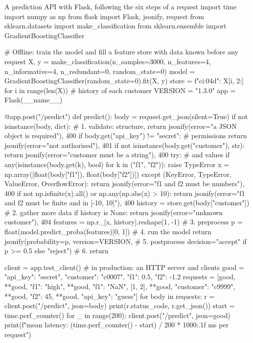 \begin{pylisting}[label={lst:api}]{A prediction API with Flask, following the six steps of a request}
import time
import numpy as np
from flask import Flask, jsonify, request
from sklearn.datasets import make_classification
from sklearn.ensemble import GradientBoostingClassifier

# Offline: train the model and fill a feature store with data known before any request
X, y = make_classification(n_samples=3000, n_features=4, n_informative=4, n_redundant=0,
                           random_state=0)
model = GradientBoostingClassifier(random_state=0).fit(X, y)
store = {f"c{i:04d}": X[i, 2:] for i in range(len(X))}       # history of each customer
VERSION = "1.3.0"
app = Flask(__name__)

@app.post("/predict")
def predict():
    body = request.get_json(silent=True)
    if not isinstance(body, dict):                          # 1. validate: structure,
        return jsonify(error="a JSON object is required"), 400
    if body.get("api_key") != "secret":                     #    permissions
        return jsonify(error="not authorised"), 401
    if not isinstance(body.get("customer"), str):
        return jsonify(error="customer must be a string"), 400
    try:                                                    #    and values
        if any(isinstance(body.get(k), bool) for k in ("f1", "f2")):
            raise TypeError
        x = np.array([float(body["f1"]), float(body["f2"])])
    except (KeyError, TypeError, ValueError, OverflowError):
        return jsonify(error="f1 and f2 must be numbers"), 400
    if not np.isfinite(x).all() or np.any(np.abs(x) > 10):
        return jsonify(error="f1 and f2 must be finite and in [-10, 10]"), 400
    history = store.get(body["customer"])                         # 2. gather more data
    if history is None:
        return jsonify(error="unknown customer"), 404
    features = np.r_[x, history].reshape(1, -1)                   # 3. preprocess
    p = float(model.predict_proba(features)[0, 1])                # 4. run the model
    return jsonify(probability=p, version=VERSION,                # 5. postprocess
                   decision="accept" if p >= 0.5 else "reject")   # 6. return

client = app.test_client()                 # in production: an HTTP server and clients
good = {"api_key": "secret", "customer": "c0007", "f1": 0.5, "f2": -1.2}
requests = [good, {**good, "f1": "high"}, {**good, "f1": "NaN"}, [1, 2],
            {**good, "customer": "c9999"}, {**good, "f2": 45},
            {**good, "api_key": "guess"}]
for body in requests:
    r = client.post("/predict", json=body)
    print(r.status_code, r.get_json())
start = time.perf_counter()
for _ in range(200):
    client.post("/predict", json=good)
print(f"mean latency: {(time.perf_counter() - start) / 200 * 1000:.1f} ms per request")
\end{pylisting}
